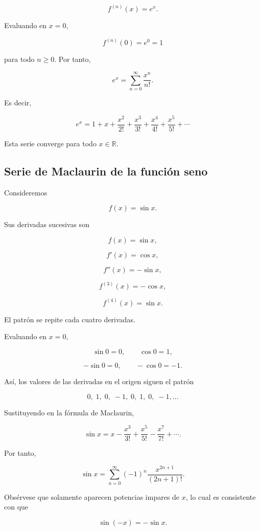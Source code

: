 \documentclass[12pt]{article}
\begin{document}
\[f^{(n)}(x)=e^x.\]

Evaluando en \(x=0\),

\[f^{(n)}(0)=e^0=1\]

para todo \(n\geq0\). Por tanto,

\[e^x=\sum_{n=0}^{\infty}\frac{x^n}{n!}.\]

Es decir,

\[\boxed{e^x=1+x+\frac{x^2}{2!}+\frac{x^3}{3!}+\frac{x^4}{4!}+\frac{x^5}{5!}+\cdots}\]

Esta serie converge para todo $x\in\mathbb{R}$.



\subsection{Serie de Maclaurin de la función seno}

Consideremos

\[
f(x)=\sin x.
\]

Sus derivadas sucesivas son

\[
f(x)=\sin x,
\]

\[
f'(x)=\cos x,
\]

\[
f''(x)=-\sin x,
\]

\[
f^{(3)}(x)=-\cos x,
\]

\[
f^{(4)}(x)=\sin x.
\]

El patrón se repite cada cuatro derivadas.

Evaluando en \(x=0\),

\[
\sin0=0,
\qquad
\cos0=1,
\]

\[
-\sin0=0,
\qquad
-\cos0=-1.
\]

Así, los valores de las derivadas en el origen siguen el patrón

\[
0,\;1,\;0,\;-1,\;0,\;1,\;0,\;-1,\ldots
\]

Sustituyendo en la fórmula de Maclaurin,

\[
\sin x
=
x
-\frac{x^3}{3!}
+\frac{x^5}{5!}
-\frac{x^7}{7!}
+\cdots.
\]

Por tanto,

\[
\boxed{
\sin x
=
\sum_{n=0}^{\infty}
(-1)^n
\frac{x^{2n+1}}{(2n+1)!}.
}
\]

Obsérvese que solamente aparecen potencias impares de \(x\), lo cual
es consistente con que

\[
\sin(-x)=-\sin x.
\]

\end{document}
